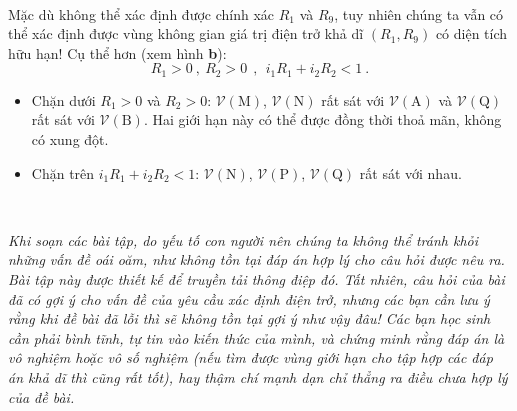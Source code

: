 \ \ 

Mặc dù không thể xác định được chính xác $R_1$ và $R_9$, tuy nhiên chúng ta vẫn có thể xác định được vùng không gian giá trị điện trở khả dĩ $(R_1,R_9)$ có diện tích hữu hạn! Cụ thể hơn (xem hình \textbf{b}):
\begin{equation}
R_1 > 0 \ , \ R_2 > 0 \ \ , \ \ i_1 R_1 + i_2 R_2 < 1 \ .
\end{equation}
\begin{itemize}
    \item Chặn dưới $R_1 > 0$ và $R_2 > 0$: $\mathcal{V}(\text{M})$, $\mathcal{V}(\text{N})$ rất sát với $\mathcal{V}(\text{A})$ và $\mathcal{V}(\text{Q})$ rất sát với $\mathcal{V}(\text{B})$. Hai giới hạn này có thể được đồng thời thoả mãn, không có xung đột.
    \item Chặn trên $i_1 R_1 + i_2 R_2 < 1$: $\mathcal{V}(\text{N})$, $\mathcal{V}(\text{P})$,  $\mathcal{V}(\text{Q})$  rất sát với nhau.
\end{itemize}

\ \ 

\textit{Khi soạn các bài tập, do yếu tố con người nên chúng ta không thể tránh khỏi những vấn đề oái oăm, như không tồn tại đáp án hợp lý cho câu hỏi được nêu ra. Bài tập này được thiết kế để truyền tải thông điệp đó. Tất nhiên, câu hỏi của bài đã có gợi ý cho vấn đề của yêu cầu xác định điện trở, nhưng các bạn cần lưu ý rằng khi đề bài đã lỗi thì sẽ không tồn tại gợi ý như vậy đâu! Các bạn học sinh cần phải bình tĩnh, tự tin vào kiến thức của mình, và chứng minh rằng đáp án là vô nghiệm hoặc vô số nghiệm (nếu tìm được vùng giới hạn cho tập hợp các đáp án khả dĩ thì cũng rất tốt), hay thậm chí mạnh dạn chỉ thẳng ra điều chưa hợp lý của đề bài.}